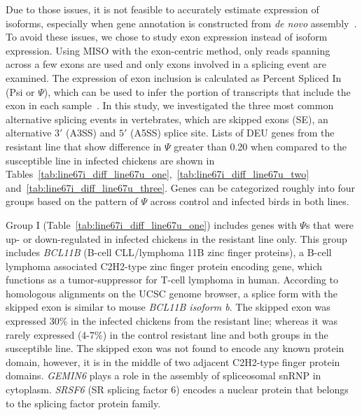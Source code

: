 Due to those issues, it is not feasible to accurately estimate
expression of isoforms, especially when gene annotation is constructed
from {\em de novo} assembly~\cite{trapnell2013differential}.  To avoid
these issues, we chose to study exon expression instead of isoform
expression.  Using MISO with the exon-centric method, only reads
spanning across a few exons are used and only exons involved in a
splicing event are examined.  The expression of exon inclusion is
calculated as Percent Spliced In (Psi or $\Psi$), which can be used to
infer the portion of transcripts that include the exon in each
sample~\cite{Katz:2010iv}.  In this study, we investigated the three
most common alternative splicing events in vertebrates, which are
skipped exons (SE), an alternative $3\prime$ (A3SS) and $5\prime$
(A5SS) splice site.  Lists of DEU genes from the resistant line that
show difference in $\Psi$ greater than 0.20 when compared to the
susceptible line in infected chickens are shown in
Tables~\ref{tab:line67i_diff_line67u_one},~\ref{tab:line67i_diff_line67u_two}
and~\ref{tab:line67i_diff_line67u_three}.  Genes can be categorized
roughly into four groups based on the pattern of $\Psi$ across control
and infected birds in both lines.

Group I (Table~\ref{tab:line67i_diff_line67u_one}) includes genes
with $\Psi$s that were up- or down-regulated in infected chickens
in the resistant line only.  This group includes {\em BCL11B}
(B-cell CLL/lymphoma 11B zinc finger proteins), a B-cell lymphoma
associated C2H2-type zinc finger protein encoding gene, which
functions as a tumor-suppressor for T-cell lymphoma in human.
According to homologous alignments on the UCSC genome browser, a
splice form with the skipped exon is similar to mouse {\em BCL11B
isoform b}.  The skipped exon was expressed 30\% in the infected
chickens from the resistant line; whereas it was rarely expressed
(4-7\%) in the control resistant line and both groups in the
susceptible line.  The skipped exon was not found to encode any
known protein domain, however, it is in the middle of two
adjacent C2H2-type finger protein domains. {\em GEMIN6} plays a
role in the assembly of spliceosomal snRNP in cytoplasm.  {\em
SRSF6} (SR splicing factor 6) encodes a nuclear protein that
belongs to the splicing factor protein family.

